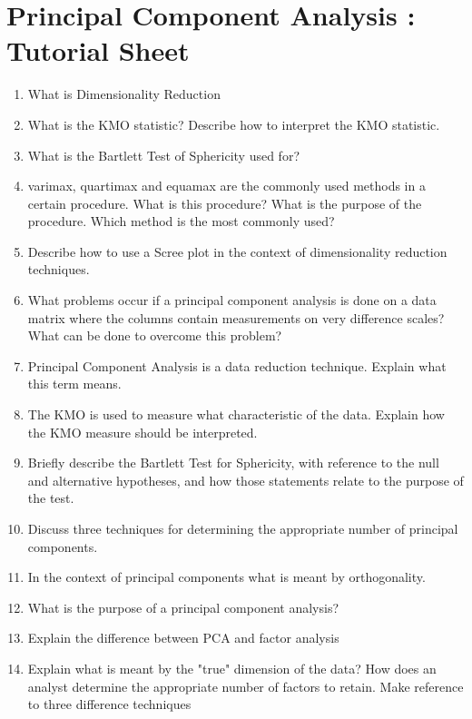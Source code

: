 \documentclass[a4paper,12pt]{article}
\begin{document}
	\section*{Principal Component Analysis : Tutorial Sheet}
	\begin{enumerate}
		\item What is Dimensionality Reduction
		\item What is the KMO statistic? Describe how to interpret the KMO statistic.
		\item What is the Bartlett Test of Sphericity used for?
		\item varimax, quartimax and equamax are the commonly used methods in a certain procedure. What is this procedure? What is the purpose of the procedure.
		Which method is the most commonly used?
		\item Describe how to use a Scree plot in the context of dimensionality reduction techniques.
		\item What problems occur if a principal component analysis is done on a data matrix where the columns contain measurements on very difference scales?  What can be done to overcome this problem?
		\item Principal Component Analysis is a data reduction technique. Explain what this term
		means.
		\item The KMO is used to measure what characteristic of the data. Explain how the KMO
		measure should be interpreted.
		\item Briefly describe the Bartlett Test for Sphericity, with reference to the null and alternative
		hypotheses, and how those statements relate to the purpose of the test.
		\item Discuss three techniques for determining the appropriate number of principal components.
		\item In the context of principal components what is meant by orthogonality.
		
		\item What is the purpose of a principal component analysis?
		\item Explain the difference between PCA and factor analysis
		\item Explain what is meant by the "true" dimension of the data? How does an analyst determine the appropriate number of factors to retain. Make reference to three difference techniques
	\end{enumerate}
	
\end{document}
